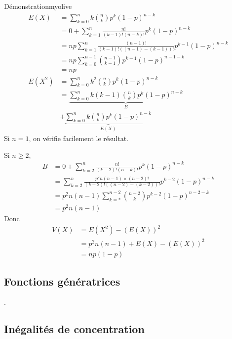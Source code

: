     \begin{demo}{Démonstration}{myolive}
        \begin{align*}
            E(X) &= \sum\limits_{k=0}^n k \binom{n}{k} p^k (1-p)^{n-k} \\
            &= 0 + \sum\limits_{k=1}^n \frac{n!}{(k-1)!(n-k)!} p^k (1-p)^{n-k} \\
            &= np \sum\limits_{k=1}^n \frac{(n-1)!}{(k-1)!((n-1)-(k-1))!} p^{k-1} (1-p)^{n-k} \\
            &= np \sum\limits_{k=0}^{n-1} \binom{n-1}{k-1} p^{k-1} (1-p)^{n-1-k} \\
            &= np \\
            E(X^2) &= \sum\limits_{k=0}^n k^2 \binom{n}{k} p^k (1-p)^{n-k} \\
            &= \underbrace{\sum\limits_{k=0}^n k(k-1) \binom{n}{k} p^k (1-p)^{n-k}}_B \\
            &+ \underbrace{\sum\limits_{k=0}^n k \binom{n}{k} p^k (1-p)^{n-k}}_{E(X)}
        \end{align*}
        Si $n =1$, on vérifie facilement le résultat.
        
        Si $n \geq 2$,
        \begin{align*}
            B &= 0 + \sum\limits_{k=2}^n \frac{n!}{(k-2)!(n-k)!} p^k (1-p)^{n-k} \\
            &= \sum\limits_{k=2}^n \frac{ p^2 n(n-1) \times (n-2)!}{(k-2)!((n-2)-(k-2))!} p^{k-2} (1-p)^{n-k} \\
            &= p^2 n(n-1) \sum\limits_{k=*}^{n-2} \binom{n-2}{k} p^{k-2} (1-p)^{n-2-k} \\
            &= p^2 n(n-1)
        \end{align*}
        Donc 
        \begin{align*}
            V(X) &= E(X^2) - (E(X))^2 \\
            &= p^2 n(n-1) + E(X) - (E(X))^2 \\
            &= np(1-p)
        \end{align*}
    \end{demo}

\subsection{Fonctions génératrices}

.

\subsection{Inégalités de concentration}

